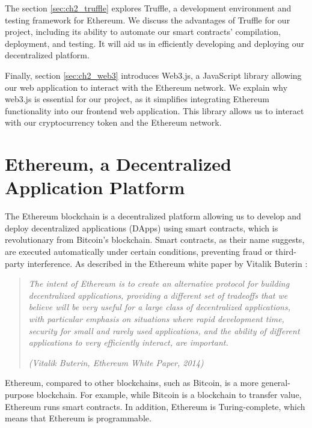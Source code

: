 The section \ref{sec:ch2_truffle} explores Truffle, a development environment and testing framework for Ethereum. We discuss the advantages of Truffle
for our project, including its ability to automate our smart contracts' compilation, deployment, and testing. It will aid us in efficiently developing
and deploying our decentralized platform.


Finally, section \ref{sec:ch2_web3} introduces Web3.js, a JavaScript library allowing our web application to interact with the Ethereum network.
We explain why web3.js is essential for our project, as it simplifies integrating Ethereum functionality into our frontend web application.
This library allows us to interact with our cryptocurrency token and the Ethereum network.


\section{Ethereum, a Decentralized Application Platform}
\label{sec:ch2_ethereum}

The Ethereum blockchain is a decentralized platform allowing us to develop and deploy decentralized applications (DApps) using smart contracts, which is 
revolutionary from Bitcoin's blockchain. Smart contracts, as their name suggests, are executed automatically under certain conditions,
preventing fraud or third-party interference. As described in the Ethereum white paper by Vitalik Buterin \cite{ethereum_white_paper}:

\begin{quote}
    \textit{The intent of Ethereum is to create an alternative protocol for building decentralized applications, providing a different set of tradeoffs that we
        believe will be very useful for a large class of decentralized applications, with particular emphasis on situations where rapid development time,
        security for small and rarely used applications, and the ability of different applications to very efficiently interact, are important.}
    
    \textit{(Vitalik Buterin, Ethereum White Paper, 2014)}
\end{quote}


Ethereum, compared to other blockchains, such as Bitcoin, is a more general-purpose blockchain. For example, while Bitcoin is a blockchain to transfer
value, Ethereum runs smart contracts. In addition, Ethereum is Turing-complete, which means that Ethereum is programmable.


